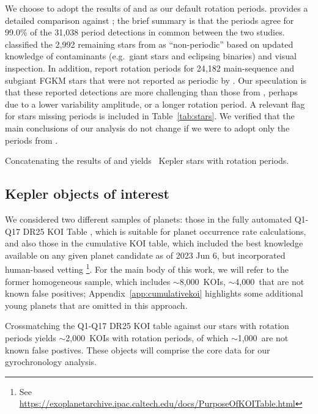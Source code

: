 \documentclass[11pt,twocolumn,tighten]{aastex63}
\newcommand{\nkois}{{$\sim$8{,}000}} %
\newcommand{\nkoisnofp}{{$\sim$4{,}000}} %
\newcommand{\nkoiswithprot}{{$\sim$2{,}000}}
\newcommand{\nkoisnofpwithprot}{{$\sim$1{,}000}}
\begin{document}
We choose to adopt the results of  and
 as our default rotation periods.
 provides a detailed comparison against
; the brief summary is that the periods
agree for 99.0\% of the 31{,}038 period detections in common between
the two studies.   classified the 2{,}992
remaining stars from  as ``non-periodic''
based on updated knowledge of contaminants (e.g.~giant stars and
eclipsing binaries) and visual inspection.  In addition,
 report rotation periods for 24{,}182
main-sequence and subgiant FGKM stars that were not reported as
periodic by .  Our speculation is that
these reported detections are more challenging than those from
, perhaps due to a lower variability
amplitude, or a longer rotation period.  A relevant flag for stars
missing  periods is included in
Table~\ref{tab:stars}.
We verified that the main conclusions of our analysis do not change if
we were to adopt only the periods from .

Concatenating the results of  and
 yields \nuniqstarsantosrot\ Kepler stars with
rotation periods.


\subsection{Kepler objects of interest}
\label{subsec:planetsel}

We considered two different samples of planets: those in the fully
automated Q1-Q17 DR25 KOI Table \citep{Thompson_2018}, which is
suitable for planet occurrence rate calculations, and also those in
the cumulative KOI table, which included the best knowledge available
on any given planet candidate as of 2023 Jun 6, but incorporated
human-based vetting \footnote{See
\url{https://exoplanetarchive.ipac.caltech.edu/docs/PurposeOfKOITable.html}}.
For the main body of this work, we will refer to the former
homogeneous sample, which includes \nkois\ KOIs, \nkoisnofp\ that are
not known false positives; Appendix~\ref{app:cumulativekoi} highlights
some additional young planets that are omitted in this approach.

Crossmatching the Q1-Q17 DR25 KOI table against our stars with
rotation periods yields \nkoiswithprot\ KOIs with rotation periods, of which \nkoisnofpwithprot\ 
are not known false postives.
These objects will comprise the core data for our gyrochronology analysis.
\end{document}

